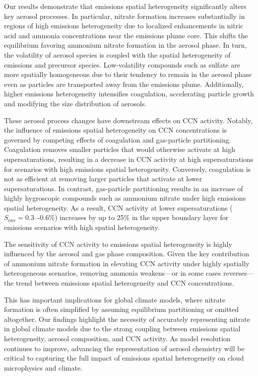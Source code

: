 \documentclass[acp]{copernicus}
\begin{document}
Our results demonstrate that emissions spatial heterogeneity
significantly alters key aerosol processes. In particular, nitrate
formation increases substantially in regions of high emissions
heterogeneity due to localized enhancements in nitric acid and ammonia
concentrations near the emissions plume core. This shifts the
equilibrium favoring ammonium nitrate formation in the aerosol
phase. In turn, the volatility of aerosol species is coupled with the
spatial heterogeneity of emissions and precursor species.
Low-volatility compounds such as sulfate are more spatially
homogeneous due to their tendency to remain in the aerosol phase even
as particles are transported away from the emissions plume.
Additionally, higher emissions heterogeneity intensifies coagulation,
accelerating particle growth and modifying the size distribution of
aerosols.

These aerosol process changes have downstream effects on CCN
activity. Notably, the influence of emissions spatial heterogeneity on
CCN concentrations is governed by competing effects of coagulation and
gas-particle partitioning. Coagulation removes smaller particles that
would otherwise activate at high supersaturations, resulting in a
decrease in CCN activity at high supersaturations for scenarios with
high emissions spatial heterogeneity. Conversely, coagulation is not
as efficient at removing larger particles that activate at lower
supersaturations. In contrast, gas-particle partitioning results in an
increase of highly hygroscopic compounds such as ammonium nitrate
under high emissions spatial heterogeneity. As a result, CCN activity
at lower supersaturations ($S_{\mathrm{env}} = 0.3\mbox{–-}0.6\%$) increases by up to
25\% in the upper boundary layer for emissions scenarios with high
spatial heterogeneity.

The sensitivity of CCN activity to emissions spatial heterogeneity is highly
influenced by the aerosol and gas phase composition. Given the key
contribution of ammonium nitrate formation in elevating CCN activity
under highly spatially heterogeneous scenarios, removing ammonia
weakens---or in some cases reverses---the trend between emissions
spatial heterogeneity and CCN concentrations.

This has important implications for global climate models, where 
nitrate formation is often simplified by assuming equilibrium partitioning 
or omitted altogether. Our findings highlight the necessity of accurately 
representing nitrate in global climate models due to the strong coupling 
between emissions spatial heterogeneity, aerosol composition, and 
CCN activity. As model resolution continues to improve, advancing the 
representation of aerosol chemistry will be critical to capturing the full impact of
emissions spatial heterogeneity on cloud microphysics and climate.
\end{document}

